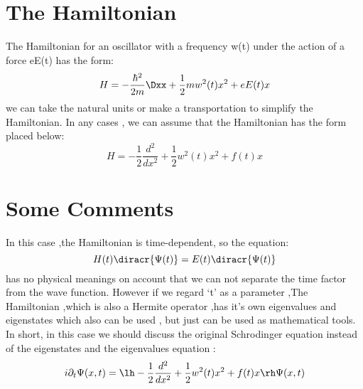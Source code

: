






\begin{frame}
\maketitle
\end{frame}

\begin{frame}
\tableofcontents[hidesubsections,sections={<1-8>}]
\end{frame}

\section{The Hamiltonian}
\begin{frame}
The Hamiltonian for an oscillator with a frequency w(t) under the action of a force eE(t) has the form:
\[H=-\frac{\hbar^2}{2m}\Dxx+\frac{1}{2}mw^2(t)x^2+eE(t)x\]
we can take the natural  units or make a transportation to simplify the Hamiltonian. In any cases , we can assume that  the Hamiltonian has the form placed below:
\[H=-\frac{1}{2}\frac{d^2}{dx^2}+\frac{1}{2}w^2(t)x^2+f(t)x\]
\end{frame}

\section{Some Comments}
\begin{frame}
In this case ,the Hamiltonian is time-dependent, so the equation:
\[H(t)\diracr{\Psi(t)}=E(t)\diracr{\Psi(t)}\]
has no physical meanings on account that we can not separate the time factor from the wave function. However if we regard ‘t’ as a parameter ,The Hamiltonian ,which is also a Hermite operator ,has it’s own eigenvalues and eigenstates which also can be used , but just can be used as mathematical tools. In short, in this case we should discuss the original Schrodinger equation instead of the eigenstates and the eigenvalues equation :
\[i\partial_t \Psi(x,t)=\lh-\frac{1}{2}\frac{d^2}{dx^2}+\frac{1}{2}w^2(t)x^2+f(t)x\rh\Psi(x,t)\]
\end{frame}

